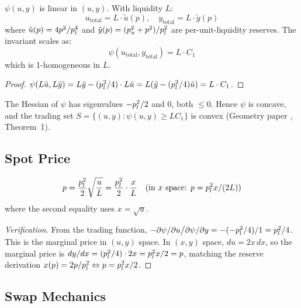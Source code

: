 \begin{theorem}\label{thm:linearity}
$\psi(u, y)$ is linear in $(u, y)$. With liquidity $L$:
\[
  u_{\text{total}} = L \cdot \tilde{u}(p), \quad
  y_{\text{total}} = L \cdot \tilde{y}(p)
\]
where $\tilde{u}(p) = 4p^2/p_l^4$ and $\tilde{y}(p) = (p_u^2 + p^2)/p_l^2$
are per-unit-liquidity reserves. The invariant scales as:
\[
  \psi(u_{\text{total}}, y_{\text{total}}) = L \cdot C_1
\]
which is 1-homogeneous in $L$.
\end{theorem}

\begin{proof}
$\psi(L\tilde{u}, L\tilde{y}) = L\tilde{y} - (p_l^2/4) \cdot L\tilde{u}
= L(\tilde{y} - (p_l^2/4)\tilde{u}) = L \cdot C_1$. \qedhere
\end{proof}

\begin{remark}[Concavity]
The Hessian of $\psi$ has eigenvalues $-p_l^2/2$ and $0$, both $\leq 0$.
Hence $\psi$ is concave, and the trading set
$S = \{(u, y) : \psi(u, y) \geq L C_1\}$ is convex
(Geometry paper \cite{angeris2023geometry}, Theorem~1).
\end{remark}

\subsection{Spot Price}

\begin{definition}\label{def:spot-price}
\begin{equation}\label{eq:spot-price}
  p = \frac{p_l^2}{2}\sqrt{\frac{u}{L}}
  = \frac{p_l^2}{2} \cdot \frac{x}{L}
  \quad\text{(in } x \text{ space: } p = p_l^2 x / (2L)\text{)}
\end{equation}
where the second equality uses $x = \sqrt{u}$.
\end{definition}

\begin{proof}[Verification]
From the trading function, $-\partial\psi/\partial u \big/ \partial\psi/\partial y
= -(-p_l^2/4) / 1 = p_l^2/4$. This is the marginal price in $(u, y)$ space.
In $(x, y)$ space, $du = 2x\, dx$, so the marginal price is
$dy/dx = (p_l^2/4) \cdot 2x = p_l^2 x/2 = p$, matching the reserve
derivation $x(p) = 2p/p_l^2 \Leftrightarrow p = p_l^2 x/2$. \qedhere
\end{proof}

\subsection{Swap Mechanics}

